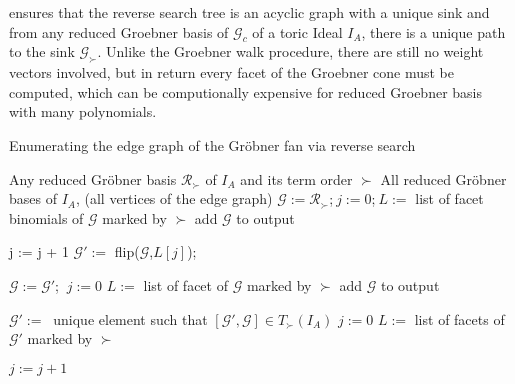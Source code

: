 \newpage

\cite{tigers}ensures that the reverse search tree is an acyclic graph with a unique sink and from any reduced Groebner basis of $\mathcal{G}_{c} $ of a toric Ideal $I_{A}$, there is a unique path to the sink $\mathcal{G}_{\succ} $.
Unlike the Groebner walk procedure, there are still no weight vectors involved, but in return every facet of the Groebner cone must be computed, which can be computionally expensive for reduced Groebner basis with many polynomials.

\begin{algorithm}
\caption{Enumerating the edge graph of the Gröbner fan via reverse search \cite{tigers}}
\label{alg:reverse}
\begin{algorithmic}[1]

\Require
Any reduced Gröbner basis $ \mathcal{R}_{\succ} $ of $I_A$ and its term order $\succ$
\Ensure All reduced Gröbner bases of $I_A$, (all vertices of the edge graph)
\State $\mathcal{G} := \mathcal{R}_{\succ}$;$~j := 0$;$~L := $ list of facet binomials of $\mathcal{G}$ marked by $\succ$
\State add $\mathcal{G}$ to output
\Repeat
{}

\State j := j + 1
\State $\mathcal{G}':= $ flip($\mathcal{G}$,$L[j]$);

\State $\mathcal{G} := \mathcal{G}' $;   $~j := 0$
\State $ L := $ list of facet of $\mathcal{G}$ marked by $\succ$
\State add $ \mathcal{G}$ to output

\EndIf 

\EndWhile

\State $\mathcal{G}' :=~$ unique element such that $[\mathcal{G}',\mathcal{G}] \in T_{\succ}(I_{A}) $
\State $j := 0$
\State $L := $ list of facets of $\mathcal{G}'$ marked by $\succ$

\Repeat
\State $j := j + 1$

\EndIf



\end{algorithmic}
\end{algorithm}

\newpage

